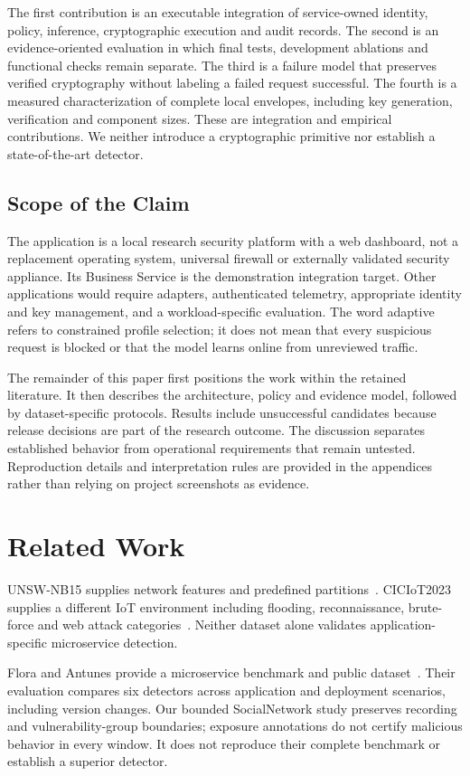 \documentclass[conference,a4paper]{IEEEtran}
\begin{document}
The first contribution is an executable integration of service-owned identity, policy, inference, cryptographic execution and audit records. The second is an evidence-oriented evaluation in which final tests, development ablations and functional checks remain separate. The third is a failure model that preserves verified cryptography without labeling a failed request successful. The fourth is a measured characterization of complete local envelopes, including key generation, verification and component sizes. These are integration and empirical contributions. We neither introduce a cryptographic primitive nor establish a state-of-the-art detector.

\subsection{Scope of the Claim}
The application is a local research security platform with a web dashboard, not a replacement operating system, universal firewall or externally validated security appliance. Its Business Service is the demonstration integration target. Other applications would require adapters, authenticated telemetry, appropriate identity and key management, and a workload-specific evaluation. The word adaptive refers to constrained profile selection; it does not mean that every suspicious request is blocked or that the model learns online from unreviewed traffic.

The remainder of this paper first positions the work within the retained literature. It then describes the architecture, policy and evidence model, followed by dataset-specific protocols. Results include unsuccessful candidates because release decisions are part of the research outcome. The discussion separates established behavior from operational requirements that remain untested. Reproduction details and interpretation rules are provided in the appendices rather than relying on project screenshots as evidence.

\section{Related Work}
UNSW-NB15 supplies network features and predefined partitions~\cite{unsw}. CICIoT2023 supplies a different IoT environment including flooding, reconnaissance, brute-force and web attack categories~\cite{ciciot}. Neither dataset alone validates application-specific microservice detection.

Flora and Antunes provide a microservice benchmark and public dataset~\cite{flora,dataset}. Their evaluation compares six detectors across application and deployment scenarios, including version changes. Our bounded SocialNetwork study preserves recording and vulnerability-group boundaries; exposure annotations do not certify malicious behavior in every window. It does not reproduce their complete benchmark or establish a superior detector.
\end{document}
